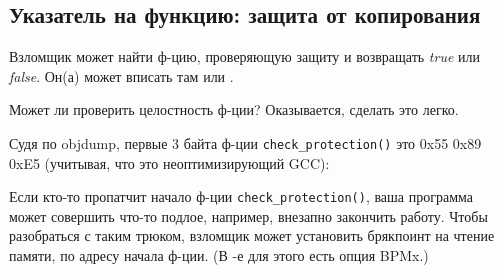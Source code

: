 \subsection{Указатель на функцию: защита от копирования}
\myindex{\SoftwareCracking}

Взломщик может найти ф-цию, проверяющую защиту и возвращать \emph{true} или \emph{false}.
Он(а) может вписать там  или .

Может ли проверить целостность ф-ции?
Оказывается, сделать это легко.

Судя по objdump, первые 3 байта ф-ции \verb|check_protection()| это 0x55 0x89 0xE5 (учитывая, что это неоптимизирующий GCC):





Если кто-то пропатчит начало ф-ции \verb|check_protection()|, ваша программа может совершить что-то подлое, например,
внезапно закончить работу.
Чтобы разобраться с таким трюком, взломщик может установить брякпоинт на чтение памяти, по адресу начала ф-ции.
(В \tracer{}-е для этого есть опция BPMx.)

